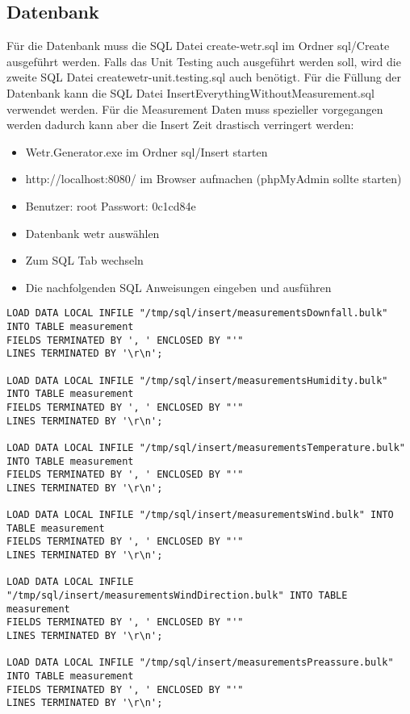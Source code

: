 \subsection{Datenbank}
Für die Datenbank muss die SQL Datei \grqq{}create-wetr.sql \grqq{} im Ordner sql/Create ausgeführt werden. Falls das Unit Testing auch ausgeführt werden soll, wird die zweite SQL Datei \grqq{}create\textunderscore wetr-unit.testing.sql \grqq{} auch benötigt.
\newline\newline
Für die Füllung der Datenbank kann die SQL Datei \grqq{}InsertEverythingWithoutMeasurement.sql\grqq{} verwendet werden. Für die Measurement Daten muss spezieller vorgegangen werden dadurch kann aber die Insert Zeit drastisch verringert werden:
\begin{itemize}
\item Wetr.Generator.exe im Ordner sql/Insert starten
\item http://localhost:8080/ im Browser aufmachen \newline (phpMyAdmin sollte starten)
\item Benutzer: root Passwort: 0c1cd84e
\item Datenbank wetr auswählen
\item Zum SQL Tab wechseln
\item Die nachfolgenden SQL Anweisungen eingeben und ausführen
\end{itemize}
\newpage
\begin{verbatim}
LOAD DATA LOCAL INFILE "/tmp/sql/insert/measurementsDownfall.bulk" INTO TABLE measurement
FIELDS TERMINATED BY ', ' ENCLOSED BY "'"
LINES TERMINATED BY '\r\n';

LOAD DATA LOCAL INFILE "/tmp/sql/insert/measurementsHumidity.bulk" INTO TABLE measurement
FIELDS TERMINATED BY ', ' ENCLOSED BY "'"
LINES TERMINATED BY '\r\n';

LOAD DATA LOCAL INFILE "/tmp/sql/insert/measurementsTemperature.bulk" INTO TABLE measurement
FIELDS TERMINATED BY ', ' ENCLOSED BY "'"
LINES TERMINATED BY '\r\n';

LOAD DATA LOCAL INFILE "/tmp/sql/insert/measurementsWind.bulk" INTO TABLE measurement
FIELDS TERMINATED BY ', ' ENCLOSED BY "'"
LINES TERMINATED BY '\r\n';

LOAD DATA LOCAL INFILE "/tmp/sql/insert/measurementsWindDirection.bulk" INTO TABLE measurement
FIELDS TERMINATED BY ', ' ENCLOSED BY "'"
LINES TERMINATED BY '\r\n';

LOAD DATA LOCAL INFILE "/tmp/sql/insert/measurementsPreassure.bulk" INTO TABLE measurement
FIELDS TERMINATED BY ', ' ENCLOSED BY "'"
LINES TERMINATED BY '\r\n';
\end{verbatim}
